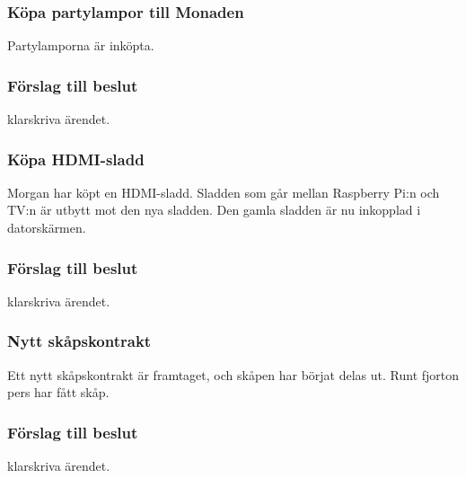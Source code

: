 \documentclass[protokoll]{dvd}
\begin{document}
\subsubsection{Köpa partylampor till Monaden}

Partylamporna är inköpta.

\subsubsection*{Förslag till beslut}

\begin{attsatser}
    \item klarskriva ärendet.
\end{attsatser}

\subsubsection{Köpa HDMI-sladd}

Morgan har köpt en HDMI-sladd.
Sladden som går mellan Raspberry Pi:n och TV:n är utbytt mot den nya sladden.
Den gamla sladden är nu inkopplad i datorskärmen.

\subsubsection*{Förslag till beslut}

\begin{attsatser}
    \item klarskriva ärendet.
\end{attsatser}

\subsubsection{Nytt skåpskontrakt}

Ett nytt skåpskontrakt är framtaget, och skåpen har börjat delas ut.
Runt fjorton pers har fått skåp.

\subsubsection*{Förslag till beslut}

\begin{attsatser}
    \item klarskriva ärendet.
\end{attsatser}

\end{document}
